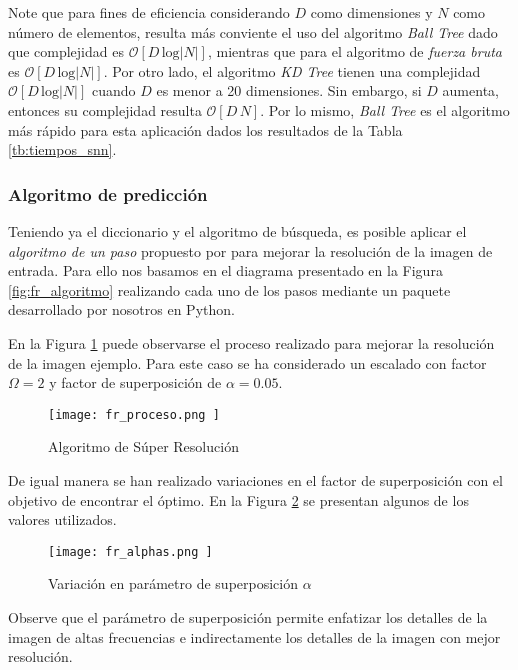 Note que para fines de eficiencia considerando $D$ como dimensiones 
y $N$ como número de elementos, resulta más conviente el uso del algoritmo
\emph{Ball Tree} dado que complejidad es $\mathcal{O}[D\,\text{log}|N| ]$,
mientras que para el algoritmo de \emph{fuerza bruta} es
$\mathcal{O}[D\,\text{log}|N| ]$. Por otro lado, el algoritmo \emph{KD Tree}
tienen una complejidad $\mathcal{O}[D\,\text{log}|N| ]$ cuando $D$ es menor a 20
dimensiones. Sin embargo, si $D$ aumenta, entonces su complejidad resulta
$\mathcal{O}[D\,N]$. Por lo mismo, \emph{Ball Tree} es el algoritmo más rápido
para esta aplicación dados los resultados de la Tabla \ref{tb:tiempos_snn}. 

\subsubsection{Algoritmo de predicción}
\noindent
Teniendo ya el diccionario y el algoritmo de búsqueda, es posible aplicar el
\emph{algoritmo de un paso} propuesto por \cite{freeman} para mejorar la 
resolución de la imagen de entrada. Para ello nos basamos en el diagrama
presentado en la Figura \ref{fig:fr_algoritmo} realizando cada uno de los 
pasos mediante un paquete desarrollado por nosotros en Python. 

En la Figura \ref{fig:fr_proceso} puede observarse el proceso realizado para mejorar 
la resolución de la imagen ejemplo. Para este caso se ha considerado un escalado
con factor  $\Omega=2$ y factor de superposición de $\alpha=0.05$.

\begin{figure}[H]
    \texttt{[image:  fr\_proceso.png ]}
    \centering
    \caption{ Algoritmo de Súper Resolución}
    \label{fig:fr_proceso}
\end{figure}

De igual manera se han realizado variaciones en el factor de superposición
con el objetivo de encontrar el óptimo. En la Figura \ref{fig:fr_alphas}
se presentan algunos de los valores utilizados. 

\begin{figure}[H]
    \texttt{[image:  fr\_alphas.png ]}
    \centering
    \caption{ Variación en parámetro de superposición $\alpha$ }
    \label{fig:fr_alphas}
\end{figure}

Observe que el parámetro de superposición permite enfatizar los detalles de
la imagen de altas frecuencias e indirectamente los detalles de la
imagen con mejor resolución. 

